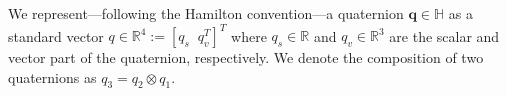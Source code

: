 \documentclass[letterpaper, 10 pt, conference]{ieeeconf}  %
\newcommand{\R}{\mathbb{R}}
\newcommand{\skewmat}[1]{[#1]^\times}
\newcommand{\q}{\textbf{q}}
\begin{document}
    We represent---following the Hamilton convention---a quaternion $\q \in \mathbb{H}$ as 
    a standard vector $q \in \R^4 := [q_s \;\; q_v^T]^T$ where $q_s \in \R$ and 
    $q_v \in \R^3$ are the scalar and vector part of the quaternion, respectively. We denote
    the composition of two quaternions as $q_3 = q_2 \otimes q_1$.
        
        
        
\end{document}
